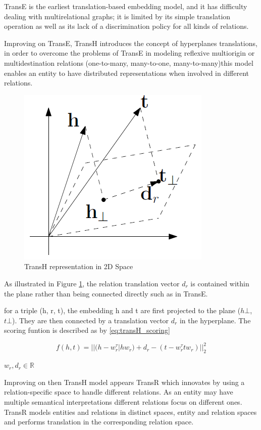 TransE is the earliest translation-based embedding model, and it has difficulty dealing with multirelational graphs; it is limited by its simple translation operation as well as its lack of a discrimination policy for all kinds of relations.

Improving on TransE, TransH introduces the concept of hyperplanes translations, in order to overcome the problems of TransE in modeling reflexive multiorigin or multidestination relations (one-to-many, many-to-one, many-to-many)this model enables an entity to have distributed representations when involved in different relations. 

\begin{figure}[!htp]
    \centering
    \includegraphics[width=.4\textwidth]{fig/embeddings/TransH.png}
    \caption{TransH representation in 2D Space}
    \label{fig:emb-transH}
\end{figure}

As illustrated in Figure \ref{fig:emb-transH}, the relation translation vector $d_r$ is contained within the plane rather than being connected directly such as in TransE.

for a triple (h, r, t), the embedding h and t are first projected to the plane ($h\bot$, $t\bot$). They are then connected by a translation vector $d_r$ in the hyperplane. The scoring funtion is described as by \ref{eq:transH_scoring}

\begin{equation}
    \label{eq:transH_scoring}
    f (h, t) = || (h - w^\tau_r |hw_r) + d_r - (t-w^\tau_r tw_r) ||^2_2
\end{equation}
\begin{center}
    $w_r, d_r \in \mathbb{R}$
\end{center}

Improving on then TransH model appears TransR\cite{} which innovates by using a relation-specific space to handle different relations. As an entity may have multiple semantical interpretations different relations focus on different ones. TransR models entities and relations in distinct spaces, entity and relation spaces and performs translation in the corresponding relation space.

